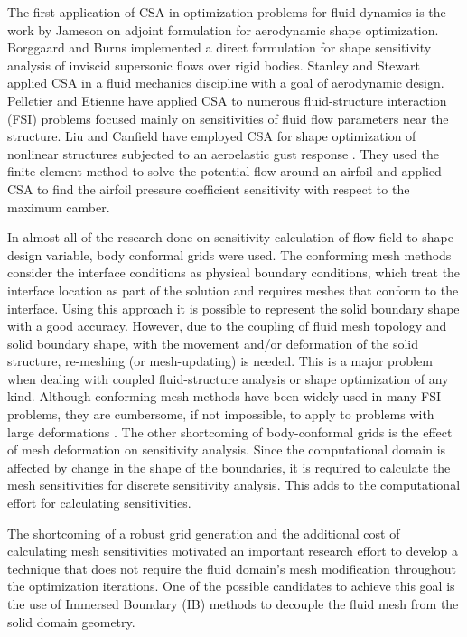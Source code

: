 The first application of CSA in optimization problems for fluid dynamics is the work by Jameson \cite{jameson1988aerodynamic} on adjoint formulation for aerodynamic shape optimization. Borggaard and Burns \cite{borggaard1995sensitivity} implemented a direct formulation for shape sensitivity analysis of inviscid supersonic flows over rigid bodies. Stanley and Stewart \cite{stanley2002design} applied CSA in a fluid mechanics discipline with a goal of aerodynamic design. Pelletier and Etienne have applied CSA to numerous fluid-structure interaction (FSI) problems \cite{etienne2005general} focused mainly on sensitivities of fluid flow parameters near the structure. Liu and Canfield have employed CSA for shape optimization of nonlinear structures subjected to an aeroelastic gust response \cite{liu2013equivalence}. They used the finite element method to solve the potential flow around an airfoil and applied CSA to find the airfoil pressure coefficient sensitivity with respect to the maximum camber. 

In almost all of the research done on sensitivity calculation of flow field to shape design variable, body conformal grids were used. The conforming mesh methods consider the interface conditions as physical boundary conditions, which treat the interface location as part of the solution and requires meshes that conform to the interface. Using this approach it is possible to represent the solid boundary shape with a good accuracy. However, due to the coupling of fluid mesh topology and solid boundary shape, with the movement and/or deformation of the solid structure, re-meshing (or mesh-updating) is needed. This is a major problem when dealing with coupled fluid-structure analysis or shape optimization of any kind. Although conforming mesh methods have been widely used in many FSI problems, they are cumbersome, if not impossible, to apply to problems with large deformations \cite{sahin2009arbitrary}. The other shortcoming of body-conformal grids is the effect of mesh deformation on sensitivity analysis. Since the computational domain is affected by change in the shape of the boundaries, it is required to calculate the mesh sensitivities \cite{liu2016two} for discrete sensitivity analysis. This adds to the computational effort for calculating  sensitivities.

The shortcoming of a robust grid generation and the additional cost of calculating mesh sensitivities motivated an important research effort to develop a technique that does not require the fluid domain's mesh modification throughout the optimization iterations. One of the possible candidates to achieve this goal is the use of Immersed Boundary (IB) methods to decouple the fluid mesh from the solid domain geometry.
